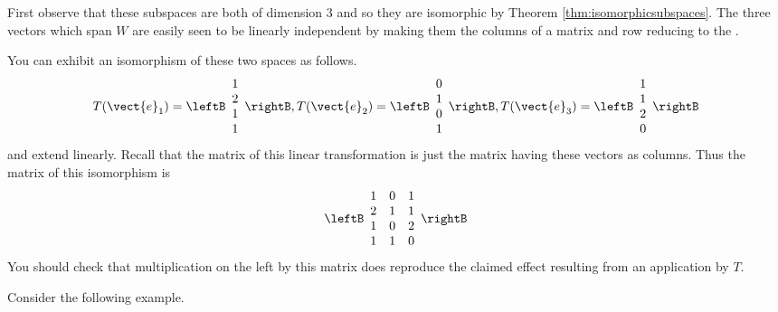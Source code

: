 \begin{solution}
First observe that these subspaces are both of dimension 3 and so they are isomorphic by Theorem \ref{thm:isomorphicsubspaces}. The
three vectors which span $W$ are easily seen to be linearly independent by
making them the columns of a matrix and row reducing to the {\rref}.

You can exhibit an isomorphism of these two spaces as follows. 
\begin{equation*}
T(\vect{e}_{1})=\leftB 
\begin{array}{c}
1 \\ 
2 \\ 
1 \\ 
1
\end{array}
\rightB, T(\vect{e}_{2})=\leftB 
\begin{array}{c}
0 \\ 
1 \\ 
0 \\ 
1
\end{array}
\rightB, T(\vect{e}_{3})=\leftB 
\begin{array}{c}
1 \\ 
1 \\ 
2 \\ 
0
\end{array}
\rightB
\end{equation*}
and extend linearly. Recall that the matrix of this linear transformation is
just the matrix having these vectors as columns. Thus the matrix of this
isomorphism is 
\begin{equation*}
\leftB 
\begin{array}{rrr}
1 & 0 & 1 \\ 
2 & 1 & 1 \\ 
1 & 0 & 2 \\ 
1 & 1 & 0
\end{array}
\rightB
\end{equation*}
You should check that multiplication on the left by this matrix does
reproduce the claimed effect resulting from an application by $T$.
\end{solution}

Consider the following example. 

